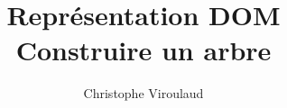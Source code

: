 \documentclass[svgnames,11pt]{beamer}
\author[]{Christophe Viroulaud}
\title{Représentation DOM\\Construire un arbre}
\date{\framebox{\textbf{Algo 05}}}
\institute{Terminale - NSI}
\begin{document}
\begin{frame}
\titlepage
\end{frame}
\end{document}
